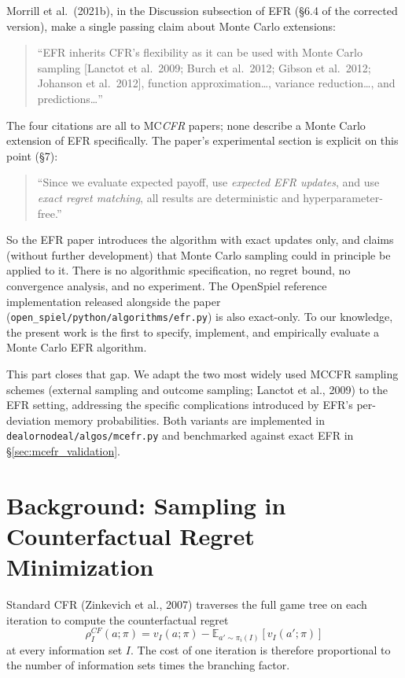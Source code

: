 \documentclass[11pt]{article}
\begin{document}
Morrill et al.~(2021b), in the Discussion subsection of EFR (\S6.4 of the corrected version), make a single passing claim about Monte Carlo extensions:
\begin{quote}
``EFR inherits CFR's flexibility as it can be used with Monte Carlo sampling [Lanctot et al.\ 2009; Burch et al.\ 2012; Gibson et al.\ 2012; Johanson et al.\ 2012], function approximation\ldots, variance reduction\ldots, and predictions\ldots''
\end{quote}
The four citations are all to MC\emph{CFR} papers; none describe a Monte Carlo extension of EFR specifically. The paper's experimental section is explicit on this point (\S7):
\begin{quote}
``Since we evaluate expected payoff, use \emph{expected EFR updates}, and use \emph{exact regret matching}, all results are deterministic and hyperparameter-free.''
\end{quote}
So the EFR paper introduces the algorithm with exact updates only, and claims (without further development) that Monte Carlo sampling could in principle be applied to it. There is no algorithmic specification, no regret bound, no convergence analysis, and no experiment. The OpenSpiel reference implementation released alongside the paper (\texttt{open\_spiel/python/algorithms/efr.py}) is also exact-only. To our knowledge, the present work is the first to specify, implement, and empirically evaluate a Monte Carlo EFR algorithm.

This part closes that gap. We adapt the two most widely used MCCFR sampling schemes (external sampling and outcome sampling; Lanctot et al., 2009) to the EFR setting, addressing the specific complications introduced by EFR's per-deviation memory probabilities. Both variants are implemented in \texttt{dealornodeal/algos/mcefr.py} and benchmarked against exact EFR in \S\ref{sec:mcefr_validation}.

\section{Background: Sampling in Counterfactual Regret Minimization}
\label{sec:mcefr_bg}

Standard CFR (Zinkevich et al., 2007) traverses the full game tree on each iteration to compute the counterfactual regret
\[
\rho^{CF}_I(a;\pi) = v_I(a;\pi) - \mathbb{E}_{a'\sim\pi_i(I)}[v_I(a';\pi)]
\]
at every information set $I$. The cost of one iteration is therefore proportional to the number of information sets times the branching factor.
\end{document}

